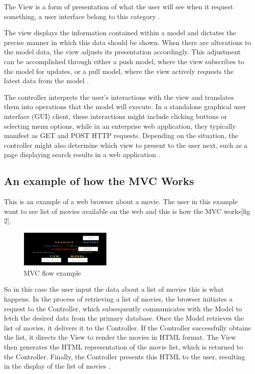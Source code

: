 \documentclass[conference]{IEEEtran}
\begin{document}
The View is a form of presentation of what the user will see when it request something, a user interface belong to this category \cite{thakur2019role}.

The view displays the information contained within a model and dictates the precise manner in which this data should be shown. When there are alterations to the model data, the view adjusts its presentation accordingly. This adjustment can be accomplished through either a push model, where the view subscribes to the model for updates, or a pull model, where the view actively requests the latest data from the model \cite{dey2011comparative}.

The controller interprets the user's interactions with the view and translates them into operations that the model will execute. In a standalone graphical user interface (GUI) client, these interactions might include clicking buttons or selecting menu options, while in an enterprise web application, they typically manifest as GET and POST HTTP requests. Depending on the situation, the controller might also determine which view to present to the user next, such as a page displaying search results in a web application \cite{dey2011comparative}.

\subsection{An example of how the MVC Works}

This is an example of a web browser about a movie. The user in this example want to see list of movies available on the web and this is how the MVC works[fig 2].

\begin{figure}
    [h]
    \centering
    \includegraphics[width = 0.4\textwidth]{Image/figure 2.PNG}
    \caption{MVC flow example \cite{rustagi2022mvc}}
    \label{fig:enter-label}
\end{figure}

So in this case the user input the data about a list of movies this is what happens. 
In the process of retrieving a list of movies, the browser initiates a request to the Controller, which subsequently communicates with the Model to fetch the desired data from the primary database. Once the Model retrieves the list of movies, it delivers it to the Controller. If the Controller successfully obtains the list, it directs the View to render the movies in HTML format. The View then generates the HTML representation of the movie list, which is returned to the Controller. Finally, the Controller presents this HTML to the user, resulting in the display of the list of movies \cite{rustagi2022mvc}.
\end{document}
